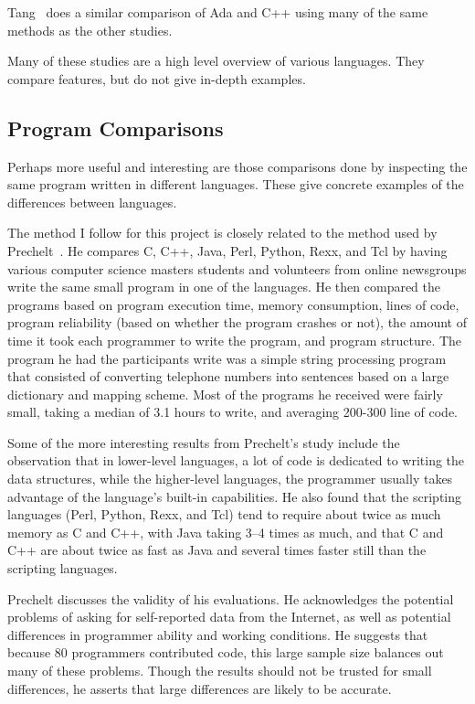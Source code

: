 \documentclass{article}
\begin{document}
Tang~\cite{TangAdaVsCpp} does a similar comparison of Ada and C++ using many of
the same methods as the other studies.

Many of these studies are a high level overview of various languages.  They
compare features, but do not give in-depth examples.

\subsection{Program Comparisons}

Perhaps more useful and interesting are those comparisons done by inspecting
the same program written in different languages.  These give concrete examples
of the differences between languages.

The method I follow for this project is closely related to the method used by
Prechelt~\cite{Prechelt7LangComp}.  He compares C, C++, Java, Perl, Python,
Rexx, and Tcl by having various computer science masters students and volunteers
from online newsgroups write the same small program in one of the languages.  He
then compared the programs based on program execution time, memory consumption,
lines of code, program reliability (based on whether the program crashes or
not), the amount of time it took each programmer to write the program, and
program structure.  The program he had the participants write was a simple
string processing program that consisted of converting telephone numbers into
sentences based on a large dictionary and mapping scheme.  Most of the programs
he received were fairly small, taking a median of 3.1 hours to write, and
averaging 200-300 line of code.

Some of the more interesting results from Prechelt's study include the
observation that in lower-level languages, a lot of code is dedicated to
writing the data structures, while the higher-level languages, the programmer
usually takes advantage of the language's built-in capabilities.  He also found
that the scripting languages (Perl, Python, Rexx, and Tcl) tend to require
about twice as much memory as C and C++, with Java taking 3--4 times as much,
and that C and C++ are about twice as fast as Java and several times faster
still than the scripting languages.

Prechelt discusses the validity of his evaluations.  He acknowledges the
potential problems of asking for self-reported data from the Internet, as well
as potential differences in programmer ability and working conditions.  He
suggests that because 80 programmers contributed code, this large sample size
balances out many of these problems.  Though the results should not be trusted
for small differences, he asserts that large differences are likely to be
accurate.
\end{document}
